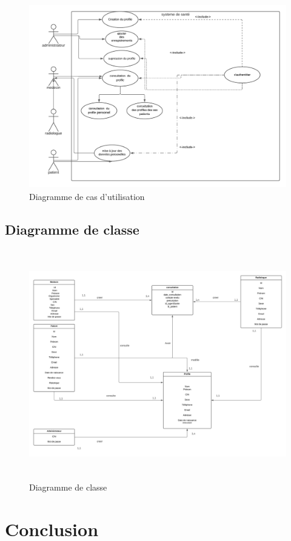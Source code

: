 \begin{figure}[!h]
\begin{center}
\includegraphics[height=8cm,width=18cm]{usecasediag.png}
\end{center}
\caption{Diagramme de cas d'utilisation}
\end{figure}

\subsection{Diagramme de classe}

\begin{figure}[!h]
\begin{center}
\includegraphics[height=10cm,width=18cm]{classdiag.png}
\end{center}
\caption{Diagramme de classe}
\end{figure}


\section{Conclusion}